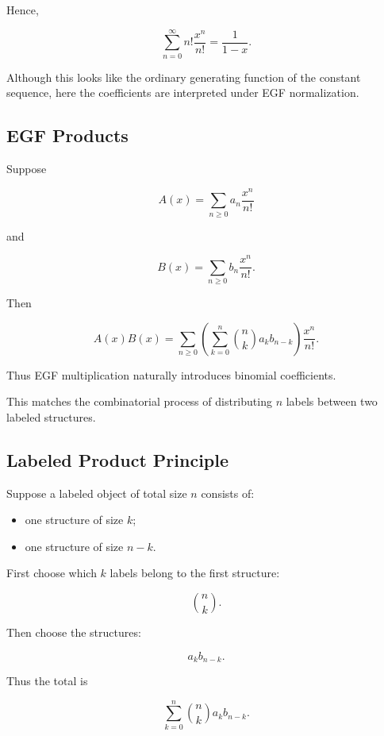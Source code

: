 Hence,

\[
\boxed{
\sum_{n=0}^{\infty}
n!\frac{x^n}{n!}
=
\frac{1}{1-x}.
}
\]

Although this looks like the ordinary generating function of the
constant sequence, here the coefficients are interpreted under EGF
normalization.

\subsection{EGF Products}
\label{subsec:egf-products}

Suppose

\[
A(x)
=
\sum_{n\geq0}
a_n\frac{x^n}{n!}
\]

and

\[
B(x)
=
\sum_{n\geq0}
b_n\frac{x^n}{n!}.
\]

Then

\[
A(x)B(x)
=
\sum_{n\geq0}
\left(
\sum_{k=0}^{n}
\binom{n}{k}
a_kb_{n-k}
\right)
\frac{x^n}{n!}.
\]

Thus EGF multiplication naturally introduces binomial coefficients.

This matches the combinatorial process of distributing \(n\) labels
between two labeled structures.

\subsection{Labeled Product Principle}
\label{subsec:labeled-product-principle}

Suppose a labeled object of total size \(n\) consists of:

\begin{itemize}
    \item one structure of size \(k\);
    \item one structure of size \(n-k\).
\end{itemize}

First choose which \(k\) labels belong to the first structure:

\[
\binom{n}{k}.
\]

Then choose the structures:

\[
a_kb_{n-k}.
\]

Thus the total is

\[
\sum_{k=0}^{n}
\binom{n}{k}
a_kb_{n-k}.
\]

